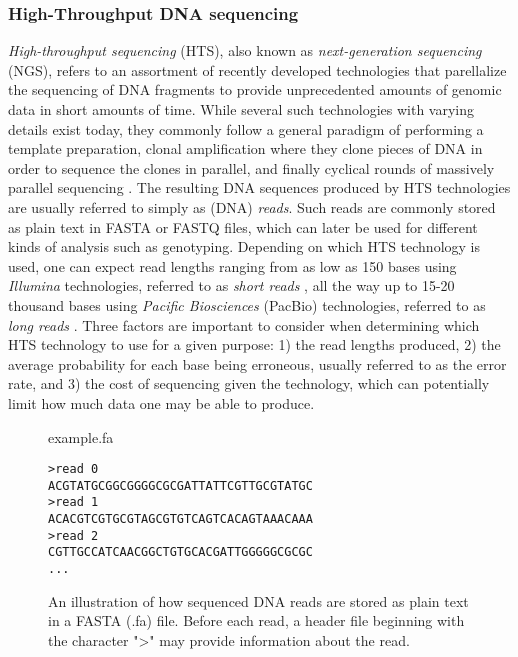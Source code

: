 \subsubsection{High-Throughput DNA sequencing} \label{background:biology:high_throughput_dna_sequencing}
\textit{High-throughput sequencing} (HTS), also known as \textit{next-generation sequencing} (NGS), refers to an assortment of recently developed technologies that parellalize the sequencing of DNA fragments to provide unprecedented amounts of genomic data in short amounts of time.
While several such technologies with varying details exist today, they commonly follow a general paradigm of performing a template preparation, clonal amplification where they clone pieces of DNA in order to sequence the clones in parallel, and finally cyclical rounds of massively parallel sequencing \cite{hts}.
The resulting DNA sequences produced by HTS technologies are usually referred to simply as (DNA) \textit{reads}.
Such reads are commonly stored as plain text in FASTA or FASTQ files, which can later be used for different kinds of analysis such as genotyping.
Depending on which HTS technology is used, one can expect read lengths ranging from as low as 150 bases using \textit{Illumina} technologies, referred to as \textit{short reads} \cite{illumina_read_length}, all the way up to 15-20 thousand bases using \textit{Pacific Biosciences} (PacBio) technologies, referred to as \textit{long reads} \cite{hts2}.
Three factors are important to consider when determining which HTS technology to use for a given purpose: 1) the read lengths produced, 2) the average probability for each base being erroneous, usually referred to as the error rate, and 3) the cost of sequencing given the technology, which can potentially limit how much data one may be able to produce.

\begin{figure}[H]
\begin{center}
\small{example.fa}
\end{center}
\begin{lstlisting}[style=vcf]
>read 0
ACGTATGCGGCGGGGCGCGATTATTCGTTGCGTATGC
>read 1
ACACGTCGTGCGTAGCGTGTCAGTCACAGTAAACAAA
>read 2
CGTTGCCATCAACGGCTGTGCACGATTGGGGGCGCGC
...
\end{lstlisting}
\caption{
  An illustration of how sequenced DNA reads are stored as plain text in a FASTA (.fa) file.
  Before each read, a header file beginning with the character ">" may provide information about the read.
}
\label{background:biology:high_throughput_dna_sequencing:figures:fasta}
\end{figure}

